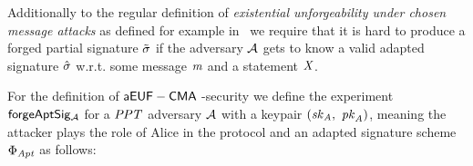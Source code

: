 \begin{definition}[$\cnstaEUFCMA$]\label{def:aeufcma}
Additionally to the regular definition of \textit{existential unforgeability under chosen message attacks} as defined for example in~\cite{vaudenay2006classical} we require that it is hard to produce a forged partial signature $\tilde{\sigma}$ if the
adversary $\mathcal{A}$ gets to know a valid adapted signature $\hat{\sigma}$ w.r.t. some message $\mathit{m}$ and a statement $\mathit{X}$.

For the definition of $\cnstaEUFCMA$-security we define the experiment $\mathsf{forgeAptSig_{\mathcal{A}}}$ for a $\mathit{PPT}$ adversary $\mathcal{A}$ with a keypair $(\mathit{sk}_{\mathit{A}} ,~ \mathit{pk}_{\mathit{A}})$,
meaning the attacker plays the role of Alice in the protocol and an adapted signature scheme $\Phi_{\mathit{Apt}}$ as
follows:


\end{definition}
